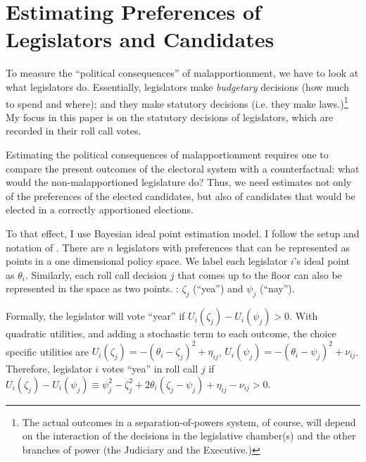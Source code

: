 




\section{Estimating Preferences of Legislators and Candidates}


To measure the ``political consequences'' of malapportionment, we have to look at what legislators do. Essentially, legislators make \emph{budgetary} decisions (how much to spend and where);  and they make statutory decisions (i.e. they make laws.)\footnote{The actual outcomes in a separation-of-powers system, of course, will depend on the interaction of the decisions in the legislative chamber(s) and the other branches of power (the Judiciary and the Executive.)} My focus in this paper is on the statutory decisions of legislators, which are recorded in their roll call votes. 

Estimating the political consequences of malapportionment requires one to compare the present outcomes of the electoral system with a counterfactual: what would the non-malapportioned legislature do? Thus, we need estimates not only of the preferences of the elected candidates, but also of candidates that would be elected in a correctly apportioned elections.

To that effect, I use  Bayesian ideal point estimation model. I follow the setup and notation of \citet{clinton:2004}.  There are $n$ legislators with preferences that can be represented as points in a one dimensional policy space. We label each legislator $i$'s ideal point as $\theta_i$. Similarly, each roll call decision $j$ that comes up to the floor can also be represented in the space as two points.  : $\zeta_j $ (``yea'')  and $\psi_j$ (``nay''). 

Formally, the legislator will vote ``year'' if $U_i(\zeta_j)-U_i(\psi_j)>0$. With quadratic utilities, and adding a stochastic term to each outcome, the choice specific utilities are $U_{i}(\zeta_j)=-(\theta_i-\zeta_j)^2+\eta_{ij}$,   $U_{i}(\psi_j)=-(\theta_i-\psi_j)^2+\nu_{ij}$. Therefore, legislator $i$ votes ``yea'' in roll call $j$  if $U_i(\zeta_j)-U_i(\psi_j)\equiv \psi^2_j-\zeta^2_j+2\theta_i(\zeta_j-\psi_j)+\eta_{ij}-\nu_{ij}>0$. 

